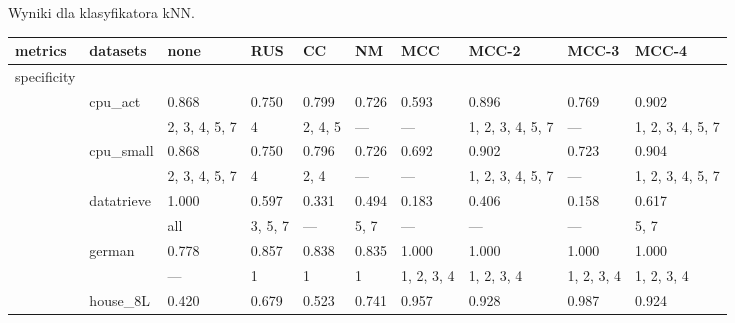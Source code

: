 \documentclass{article}
\begin{document}
\newpage
\begin{center}
\caption{Wyniki dla klasyfikatora kNN.}\label{tab:my_label_kNN}
\begin{longtable}{p{1.2cm}p{1.8cm}p{1cm}p{1cm}p{1cm}p{1cm}p{1cm}p{1cm}p{1cm}p{1cm}}
\hline
 metrics     & datasets     & none             & RUS              & CC               & NM               & MCC        & MCC-2         & MCC-3         & MCC-4         \\
\hline
\endhead
 specificity &              &               &                  &                  &                  &                  &                  &                  &                  \\
             & cpu\_act      & 0.868         & 0.750            & 0.799            & 0.726            & 0.593            & 0.896            & 0.769            & 0.902            \\
             &              & 2, 3, 4, 5, 7 & 4                & 2, 4, 5          & ---              & ---              & 1, 2, 3, 4, 5, 7 & ---              & 1, 2, 3, 4, 5, 7 \\
             & cpu\_small    & 0.868         & 0.750            & 0.796            & 0.726            & 0.692            & 0.902            & 0.723            & 0.904            \\
             &              & 2, 3, 4, 5, 7 & 4                & 2, 4             & ---              & ---              & 1, 2, 3, 4, 5, 7 & ---              & 1, 2, 3, 4, 5, 7 \\
             & datatrieve   & 1.000         & 0.597            & 0.331            & 0.494            & 0.183            & 0.406            & 0.158            & 0.617            \\
             &              & all           & 3, 5, 7          & ---              & 5, 7             & ---              & ---              & ---              & 5, 7             \\
             & german       & 0.778         & 0.857            & 0.838            & 0.835            & 1.000            & 1.000            & 1.000            & 1.000            \\
             &              & ---           & 1                & 1                & 1                & 1, 2, 3, 4       & 1, 2, 3, 4       & 1, 2, 3, 4       & 1, 2, 3, 4       \\
             & house\_8L     & 0.420         & 0.679            & 0.523            & 0.741            & 0.957            & 0.928            & 0.987            & 0.924            \\

\end{longtable}
\end{center}
\end{document}
